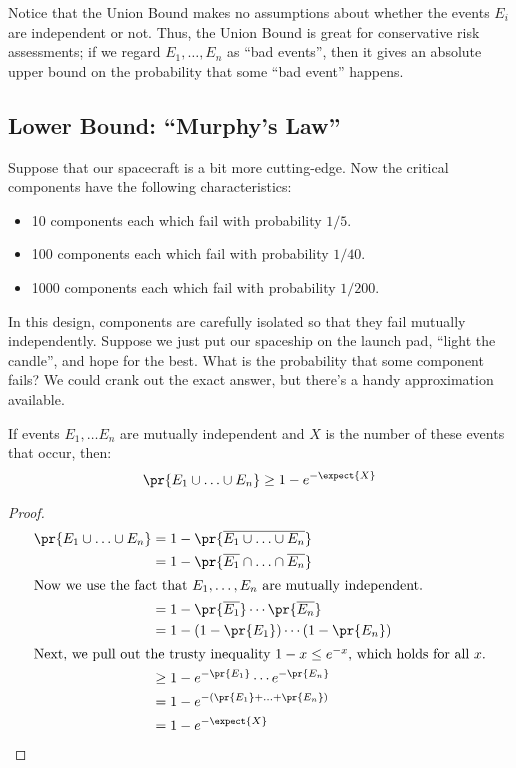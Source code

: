 \begin{editingnotes}
Notice that the Union Bound makes no assumptions about whether the
events $E_i$ are independent or not.  Thus, the Union Bound is great
for conservative risk assessments; if we regard $E_1, \ldots, E_n$ as
``bad events'', then it gives an absolute upper bound on the
probability that some ``bad event'' happens.

\subsection{Lower Bound:  ``Murphy's Law''}

Suppose that our spacecraft is a bit more cutting-edge.  Now the
critical components have the following characteristics:
%
\begin{itemize}
\item 10 components each which fail with probability $1/5$.
\item 100 components each which fail with probability $1/40$.
\item 1000 components each which fail with probability $1/200$.
\end{itemize}
%
In this design, components are carefully isolated so that they fail
mutually independently.  Suppose we just put our spaceship on the
launch pad, ``light the candle'', and hope for the best.  What is the
probability that some component fails?  We could crank out the exact
answer, but there's a handy approximation available.

\begin{theorem}
\label{th:murphy-edn}
If events $E_1, \ldots E_n$ are mutually independent and $X$ is the
number of these events that occur, then:
%
\[
\pr{E_1 \cup \ldots \cup E_n} \geq 1 - e^{-\expect{X}}
\]
\end{theorem}

\begin{proof}
\begin{align*}
\pr{E_1 \cup \ldots \cup E_n}
    & = 1 - \pr{\overline{E_1 \cup \ldots \cup E_n}} \\
    & = 1 - \pr{\overline{E_1} \cap \ldots \cap \overline{E_n}} \\
%
\intertext{Now we use the fact that $E_1, \ldots, E_n$ are mutually
independent.}
%
    & = 1 - \pr{\overline{E_1}} \cdots \pr{\overline{E_n}} \\
    & = 1 - (1 - \pr{E_1}) \cdots (1 - \pr{E_n}) \\
%
\intertext{Next, we pull out the trusty inequality $1 - x \leq
e^{-x}$, which holds for all $x$.}
%
    & \geq 1 - e^{-\pr{E_1}} \cdots e^{-\pr{E_n}} \\
    & = 1 - e^{-(\pr{E_1} + \ldots + \pr{E_n})} \\
    & = 1 - e^{-\expect{X}}
\end{align*}
\end{proof}


\end{editingnotes}

